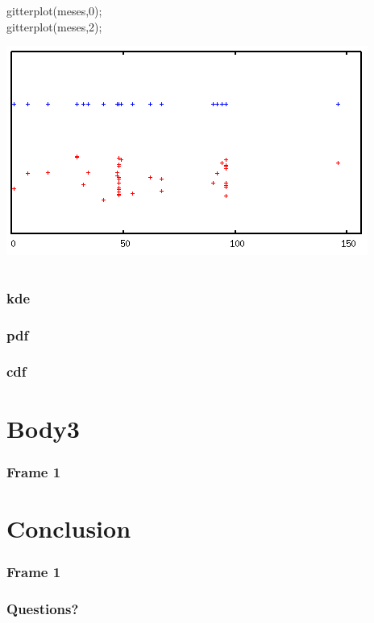\documentclass{beamer}
\begin{document}
\begin{frame}
\begin{columns}
\begin{column}{0.7\textwidth}
\begin{center}
gitterplot(meses,0);\\
gitterplot(meses,2);
\end{center}
\includegraphics[scale=0.5]{jitterplot.png}

\end{column}
\end{columns}

\end{frame}

\begin{frame}
\frametitle{kde}
\end{frame}

\begin{frame}
\frametitle{pdf}
\end{frame}

\begin{frame}
\frametitle{cdf}
\end{frame}

\section{Body3}
\begin{frame}
\frametitle{Frame 1}
\end{frame}
\section{Conclusion}
\begin{frame}
\frametitle{Frame 1}
\end{frame}

\begin{frame}
\frametitle{Questions?}
\end{frame}
\end{document}
